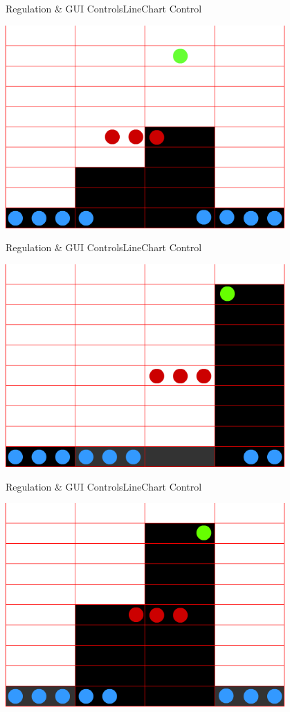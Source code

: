 	\begin{frame}{Regulation \& GUI Controls}{LineChart Control}
	\begin{center}			
		\includegraphics[width=0.8\textwidth]{../regulation/TooManySamples020003.png}
	\end{center}
	\end{frame}
	
	\begin{frame}{Regulation \& GUI Controls}{LineChart Control}
	\begin{center}			
		\includegraphics[width=0.8\textwidth]{../regulation/TooManySamples030001.png}
	\end{center}
	\end{frame}
	
	\begin{frame}{Regulation \& GUI Controls}{LineChart Control}
	\begin{center}			
		\includegraphics[width=0.8\textwidth]{../regulation/TooManySamples030002.png}
	\end{center}
	\end{frame}
	
